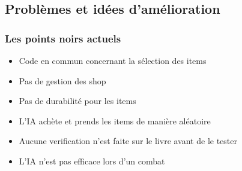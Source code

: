 \documentclass[beamer]{BetterDocument}
\begin{document}
	\subsection{Problèmes et idées d'amélioration}
	\begin{frame}
		\frametitle{Les points noirs actuels}

		\begin{itemize}
			\item{Code en commun concernant la sélection des items}
			\item{Pas de gestion des shop}
			\item{Pas de durabilité pour les items}
			\item{L'IA achète et prends les items de manière aléatoire}
			\item{Aucune verification n'est faite sur le livre avant de le tester}
			\item{L'IA n'est pas efficace lors d'un combat}
		\end{itemize}
	\end{frame}
\end{document}

